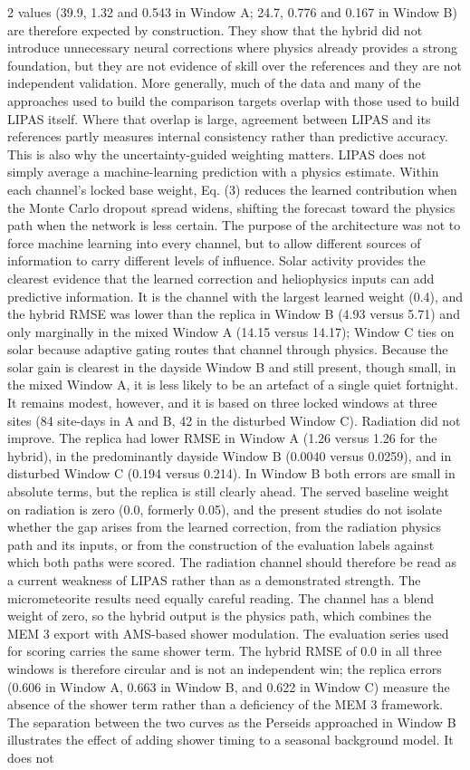\begin{multicols}{2}
values (39.9, 1.32 and 0.543 in Window A; 24.7, 0.776 and 0.167 in Window B) are therefore expected by construction. They show that the hybrid did not introduce unnecessary neural corrections where physics already provides a strong foundation, but they are not evidence of skill over the references and they are not independent validation. More generally, much of the data and many of the approaches used to build the comparison targets overlap with those used to build LIPAS itself. Where that overlap is large, agreement between LIPAS and its references partly measures internal consistency rather than predictive accuracy. This is also why the uncertainty-guided weighting matters. LIPAS does not simply average a machine-learning prediction with a physics estimate. Within each channel's locked base weight, Eq. (3) reduces the learned contribution when the Monte Carlo dropout spread widens, shifting the forecast toward the physics path when the network is less certain. The purpose of the architecture was not to force machine learning into every channel, but to allow different sources of information to carry different levels of influence. Solar activity provides the clearest evidence that the learned correction and heliophysics inputs can add predictive information. It is the channel with the largest learned weight (0.4), and the hybrid RMSE was lower than the replica in Window B (4.93 versus 5.71) and only marginally in the mixed Window A (14.15 versus 14.17); Window C ties on solar because adaptive gating routes that channel through physics. Because the solar gain is clearest in the dayside Window B and still present, though small, in the mixed Window A, it is less likely to be an artefact of a single quiet fortnight. It remains modest, however, and it is based on three locked windows at three sites (84 site-days in A and B, 42 in the disturbed Window C). Radiation did not improve. The replica had lower RMSE in Window A (1.26 versus 1.26 for the hybrid), in the predominantly dayside Window B (0.0040 versus 0.0259), and in disturbed Window C (0.194 versus 0.214). In Window B both errors are small in absolute terms, but the replica is still clearly ahead. The served baseline weight on radiation is zero (0.0, formerly 0.05), and the present studies do not isolate whether the gap arises from the learned correction, from the radiation physics path and its inputs, or from the construction of the evaluation labels against which both paths were scored. The radiation channel should therefore be read as a current weakness of LIPAS rather than as a demonstrated strength. The micrometeorite results need equally careful reading. The channel has a blend weight of zero, so the hybrid output is the physics path, which combines the MEM 3 export with AMS-based shower modulation. The evaluation series used for scoring carries the same shower term. The hybrid RMSE of 0.0 in all three windows is therefore circular and is not an independent win; the replica errors (0.606 in Window A, 0.663 in Window B, and 0.622 in Window C) measure the absence of the shower term rather than a deficiency of the MEM 3 framework. The separation between the two curves as the Perseids approached in Window B illustrates the effect of adding shower timing to a seasonal background model. It does not 
\end{multicols}
